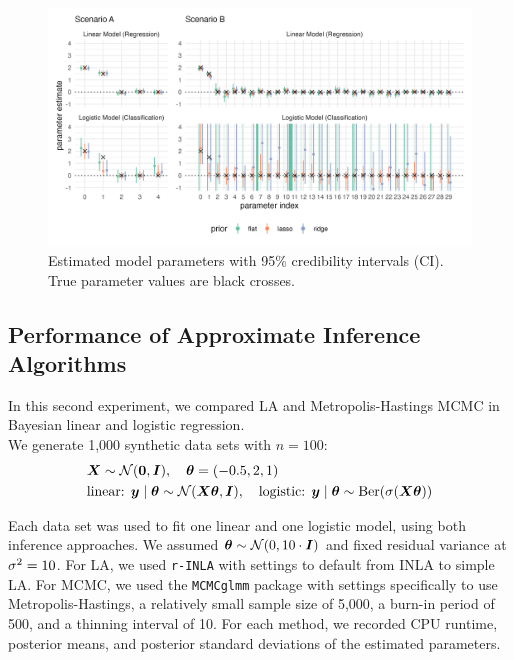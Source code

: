 \begin{figure}[htbp]
    \centering
    \includegraphics[width=\linewidth]{../figures/reg_all.png}
    \caption{Estimated model parameters with 95\% credibility intervals (CI).
    True parameter values are black crosses.
    }
    \label{fig:reg-params}
\end{figure}

\subsection{Performance of Approximate Inference Algorithms}

In this second experiment, we compared LA and Metropolis-Hastings MCMC in Bayesian linear and logistic regression.\\

We generate 1,000 synthetic data sets with $n=100$:
\begin{equation*}
    \begin{aligned}
        &\bm{X} \sim \mathcal{N}(\bm{0}, \bm{I}), \quad \bm{\theta} = (-0.5, 2, 1)\\
        &\text{linear: } \bm{y} \mid \bm{\theta} \sim \mathcal{N}(\bm{X} \bm{\theta}, \bm{I}),\quad \text{logistic: } \bm{y} \mid \bm{\theta} \sim \text{Ber}(\sigma(\bm{X} \bm{\theta}))
    \end{aligned}
\end{equation*}

Each data set was used to fit one linear and one logistic model, using both inference approaches.
We assumed $\bm{\theta} \sim \mathcal{N}(0, 10 \cdot \bm{I})$ and fixed residual variance  at $\sigma^2 = 10$.
For LA, we used \texttt{r-INLA} \citep[][\url{ www.r-inla.org}]{rue_approximate_2009} with settings to default from INLA to simple LA.
For MCMC, we used the \texttt{MCMCglmm} package \citep{MCMCglmm_2010} with settings specifically to use Metropolis-Hastings, a relatively small sample size of 5,000, a burn-in period of 500, and a thinning interval of 10.
For each method, we recorded CPU runtime, posterior means, and posterior standard deviations of the estimated parameters.\\

